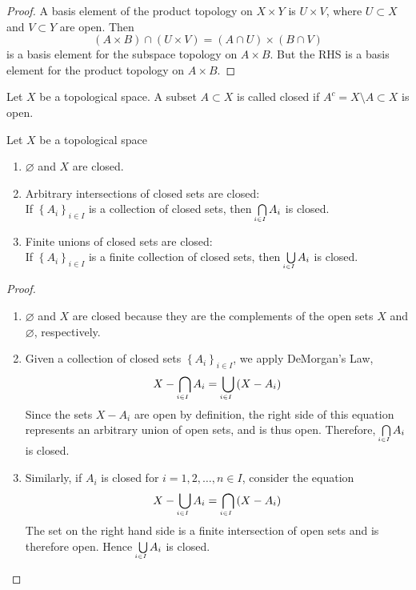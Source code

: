 \begin{proof}
A basis element of the product topology on $X \times Y$ is $U\times V$, where $U\subset X$ and $V \subset Y$ are open. Then 
$$\left(A \times B\right) \cap \left(U \times V\right) = \left(A\cap U\right) \times \left(B \cap V\right)$$
is a basis element for the subspace topology on $A \times B$. But the RHS is a basis element for the product topology on $A\times B$.
\end{proof}

\begin{customdefinition}{2.11}
Let $X$ be a topological space. A subset $A \subset X$ is called closed if $A^c = X \setminus A \subset X$ is open.
\end{customdefinition}

\begin{customthm}{2.11}
Let $X$ be a topological space
\begin{enumerate}
    \item[1).] $\varnothing$ and $X$ are closed.
    \item[2).] Arbitrary intersections of closed sets are closed:\\
                If $\left\{A_i\right\}_{i \in I}$ is a collection of closed sets, then $\underaccent{i\in I}{\bigcap} A_i$ is closed.
    \item[3).] Finite unions of closed sets are closed:\\
                If $\left\{A_i\right\}_{i \in I}$ is a finite collection of closed sets, then $\underaccent{i\in I}{\bigcup} A_i$ is closed.
\end{enumerate}
\end{customthm}

\newpage

\begin{proof}
\begin{enumerate}
    \item[1).] $\varnothing$ and $X$ are closed because they are the complements of the open sets $X$ and $\varnothing$, respectively.
    \item[2).] Given a collection of closed sets $\left\{A_i\right\}_{i \in I}$, we apply DeMorgan's Law,
        $$X - \underaccent{i \in I}{\bigcap} A_i = \underaccent{i\in I}{\bigcup} \left(X - A_i\right)$$
        Since the sets $X - A_i$ are open by definition, the right side of this equation represents an arbitrary union of open sets, and is thus open. Therefore, $\underaccent{i \in I}{\bigcap} A_i$ is closed.
    \item[3).] Similarly, if $A_i$ is closed for $i = 1, 2, \dots, n \in I $, consider the equation
        $$X - \underaccent{i \in I}{\bigcup} A_i = \underaccent{i\in I}{\bigcap} \left(X - A_i\right)$$
        The set on the right hand side is a finite intersection of open sets and is therefore open. Hence $\underaccent{i \in I}{\bigcup} A_i$ is closed.
\end{enumerate}
\end{proof}

